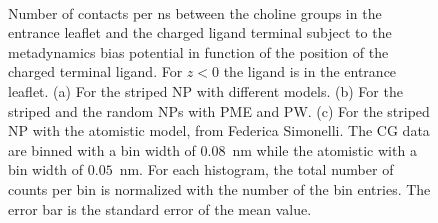 \begin{figure}[!ht]
	\center
	\\%
	\caption{Number of contacts per ns between the choline groups in the entrance leaflet and the charged ligand terminal subject to the metadynamics bias potential in function of the position of the charged terminal ligand. For $z<0$ the ligand is in the entrance leaflet. (a) For the striped \acs{NP} with different models. (b) For the striped and the random \acs{NP}s with \acs{PME} and \acs{PW}. (c) For the striped \ac{NP} with the atomistic model, from Federica Simonelli.  The \ac{CG} data are binned with a bin width of $0.08$~nm while the atomistic with a bin width of $0.05$~nm. For each histogram, the total number of counts per bin is normalized with the number of the bin entries. The error bar is the standard error of the mean value.}%
	\label{fig:NC3Contact}
\end{figure}

